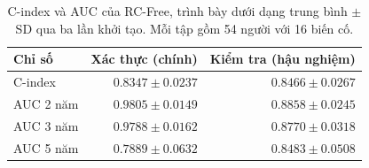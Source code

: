 \begin{table}[H]
\centering\small
\caption[C-index và AUC của RC-Free]{C-index và AUC của RC-Free, trình bày dưới dạng trung bình $\pm$ SD qua ba lần khởi tạo. Mỗi tập gồm 54 người với 16 biến cố.}
\label{tab:survival-metrics}
\begin{tabularx}{\linewidth}{@{}Y r r@{}}
\toprule
\textbf{Chỉ số} & \textbf{Xác thực (chính)} & \textbf{Kiểm tra (hậu nghiệm)} \\
\midrule
C-index & $\mathbf{0.8347\pm0.0237}$ & $\mathbf{0.8466\pm0.0267}$ \\
AUC 2 năm & $\mathbf{0.9805\pm0.0149}$ & $0.8858\pm0.0245$ \\
AUC 3 năm & $\mathbf{0.9788\pm0.0162}$ & $0.8770\pm0.0318$ \\
AUC 5 năm & $0.7889\pm0.0632$ & $0.8483\pm0.0508$ \\
\bottomrule
\end{tabularx}
\end{table}
